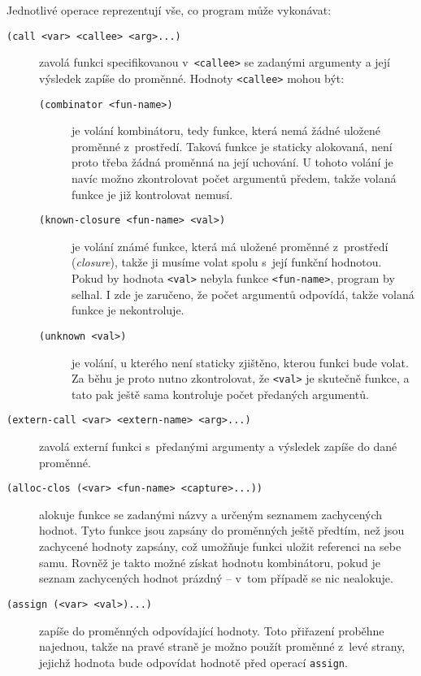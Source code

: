 Jednotlivé operace reprezentují vše, co program může vykonávat:

\begin{description}
  \item[\texttt{(call <var> <callee> <arg>...)}] zavolá funkci specifikovanou
    v~\texttt{<callee>} se zadanými argumenty a její výsledek zapíše do proměnné.
    Hodnoty \texttt{<callee>} mohou být:
    \begin{description}
      \item[\texttt{(combinator <fun-name>)}] je volání kombinátoru, tedy
        funkce, která nemá žádné uložené proměnné z~prostředí. Taková funkce je
        staticky alokovaná, není proto třeba žádná proměnná na její uchování.
        U tohoto volání je navíc možno zkontrolovat počet argumentů předem,
        takže volaná funkce je již kontrolovat nemusí.
      \item[\texttt{(known-closure <fun-name> <val>)}] je volání známé funkce,
        která má uložené proměnné z~prostředí (\emph{closure}), takže ji musíme
        volat spolu s~její funkční hodnotou. Pokud by hodnota \texttt{<val>}
        nebyla funkce \texttt{<fun-name>}, program by selhal. I zde je zaručeno,
        že počet argumentů odpovídá, takže volaná funkce je nekontroluje.
      \item[\texttt{(unknown <val>)}] je volání, u kterého není staticky
        zjištěno, kterou funkci bude volat. Za běhu je proto nutno zkontrolovat,
        že \texttt{<val>} je skutečně funkce, a tato pak ještě sama kontroluje
        počet předaných argumentů.
    \end{description}

  \item[\texttt{(extern-call <var> <extern-name> <arg>...)}] zavolá externí
    funkci s~předanými argumenty a výsledek zapíše do dané proměnné.

  \item[\texttt{(alloc-clos (<var> <fun-name> <capture>...))}] alokuje funkce se
    zadanými názvy a určeným seznamem zachycených hodnot. Tyto funkce jsou
    zapsány do proměnných ještě předtím, než jsou zachycené hodnoty zapsány, což
    umožňuje funkci uložit referenci na sebe samu. Rovněž je takto možné získat
    hodnotu kombinátoru, pokud je seznam zachycených hodnot prázdný -- v~tom
    případě se nic nealokuje.

  \item[\texttt{(assign (<var> <val>)...)}] zapíše do proměnných odpovídající
    hodnoty. Toto přiřazení proběhne najednou, takže na pravé straně je možno
    použít proměnné z~levé strany, jejichž hodnota bude odpovídat hodnotě před
    operací \texttt{assign}.
\end{description}

